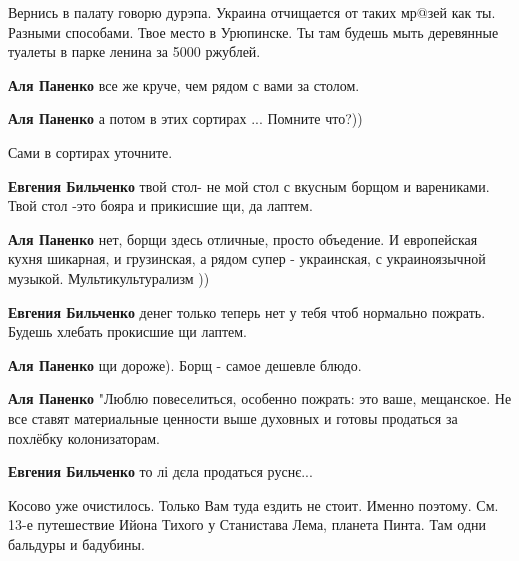  
 
 
 
 
\zzSecCmt

\begin{itemize} %

Вернись в палату говорю дурэпа. Украина отчищается от таких мр@зей как ты.
Разными способами. Твое место в Урюпинске. Ты там будешь мыть деревянные
туалеты в парке ленина за 5000 ржублей.

\begin{itemize} %
\textbf{Аля Паненко} все же круче, чем рядом с вами за столом.


\textbf{Аля Паненко} а потом в этих сортирах ... Помните что?))

Сами в сортирах уточните.

\textbf{Евгения Бильченко} твой стол- не мой стол с вкусным борщом и варениками. Твой стол -это бояра и прикисшие щи, да лаптем.

\textbf{Аля Паненко} нет, борщи здесь отличные, просто объедение. И европейская кухня шикарная, и грузинская, а рядом супер - украинская, с украиноязычной музыкой. Мультикультурализм ))

\textbf{Евгения Бильченко} денег только теперь нет у тебя чтоб нормально пожрать. Будешь хлебать прокисшие щи лаптем.


\textbf{Аля Паненко} щи дороже). Борщ - самое дешевле блюдо.

\textbf{Аля Паненко} "Люблю повеселиться, особенно пожрать: это ваше, мещанское. Не все ставят материальные ценности выше духовных и готовы продаться за похлёбку колонизаторам.

\textbf{Евгения Бильченко} то лі дєла продаться руснє...


Косово уже очистилось. Только Вам туда ездить не стоит. Именно поэтому. См.
13-е путешествие Ийона Тихого у Станистава Лема, планета Пинта. Там одни
бальдуры и бадубины.


\end{itemize}
\end{itemize}
